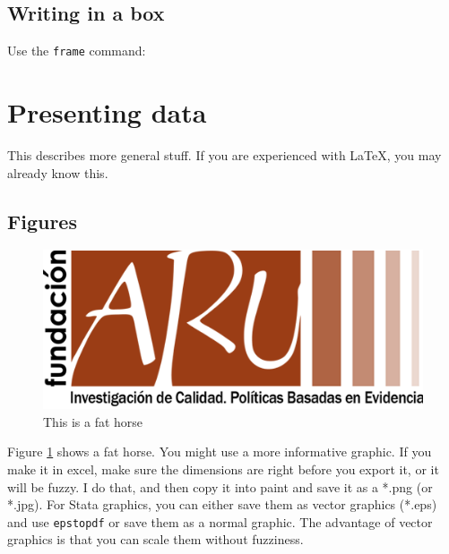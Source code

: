 \documentclass[10pt]{article}
\begin{document}
\subsection{Writing in a box}

Use the \texttt{frame} command:


\section{Presenting data}

This describes more general stuff.  If you are experienced with \LaTeX, you may already know this.

\subsection{Figures}
\begin{figure}[h]
\centering
\caption{This is a fat horse}
\label{fathorse}
\includegraphics[scale=.5]{arulogo}
\end{figure}

Figure \ref{fathorse} shows a fat horse.  You might use a more informative graphic.  If you make it in excel, make sure the dimensions are right before you export it, or it will be fuzzy.  I do that, and then copy it into paint and save it as a *.png (or *.jpg).  For Stata graphics, you can either save them as vector graphics (*.eps) and use \texttt{epstopdf} or save them as a normal graphic.  The advantage of vector graphics is that you can scale them without fuzziness.
\end{document}
